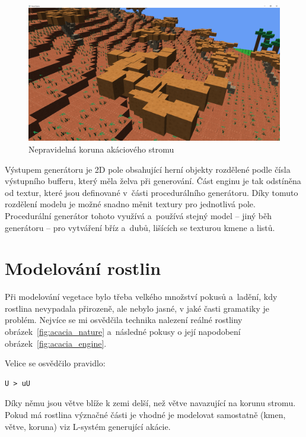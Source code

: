 \documentclass[thesis=M,czech]{FITthesis}[2019/12/23]
\begin{document}
\begin{figure}\centering
	\includegraphics[width=\textwidth]{images/acacia_random_angle_leaves}
	\caption[Nepravidelná koruna akáciového stromu]{Nepravidelná koruna akáciového stromu}\label{fig:acacia_random_angle_leaves}
\end{figure}

Výstupem generátoru je 2D pole obsahující herní objekty rozdělené podle čísla výstupního bufferu, který měla želva při generování. Část enginu je tak odstíněna od textur, které jsou definované v~části procedurálního generátoru. Díky tomuto rozdělení modelu je možné snadno měnit textury pro jednotlivá pole. Procedurální generátor tohoto využívá a~používá stejný model -- jiný běh generátoru -- pro vytváření bříz a~dubů, lišících se texturou kmene a listů.

\section{Modelování rostlin}

Při modelování vegetace bylo třeba velkého množství pokusů a~ladění, kdy rostlina nevypadala přirozeně, ale nebylo jasné, v jaké časti gramatiky je problém. Nejvíce se mi osvědčila technika nalezení reálné rostliny obrázek~\ref{fig:acacia_nature} a~následné pokusy o její napodobení obrázek~\ref{fig:acacia_engine}.

Velice se osvědčilo pravidlo:

\begin{verbatim}
U > uU
\end{verbatim}

Díky němu jsou větve blíže k zemi delší, než větve navazující na korunu stromu. Pokud má rostlina význačné části je vhodné je modelovat samostatně (kmen, větve, koruna) viz L-systém generující akácie.
\end{document}
